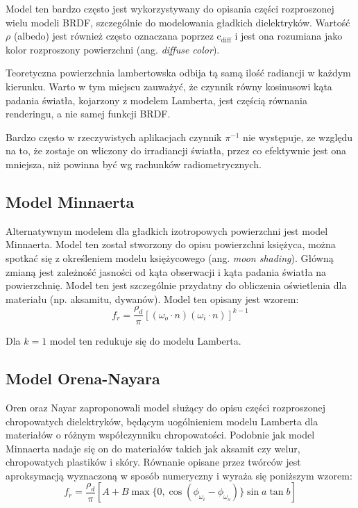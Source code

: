 \documentclass[../main.tex]{subfiles}
\begin{document}
Model ten bardzo często jest wykorzystywany do opisania części rozproszonej wielu modeli BRDF, szczególnie do modelowania gładkich dielektryków. Wartość $\rho$ (albedo) jest również często oznaczana poprzez $\text{c}_{\text{diff}}$ i jest ona rozumiana jako kolor rozproszony powierzchni (ang. \textit{diffuse color}).

Teoretyczna powierzchnia lambertowska odbija tą samą ilość radiancji w każdym kierunku. Warto w tym miejscu zauważyć, że czynnik równy kosinusowi kąta padania światła, kojarzony z modelem Lamberta, jest częścią równania renderingu, a nie samej funkcji BRDF.

Bardzo często w rzeczywistych aplikacjach czynnik $\pi^{-1}$ nie występuje, ze względu na to, że zostaje on wliczony do irradiancji światła, przez co efektywnie jest ona mniejsza, niż powinna być wg rachunków radiometrycznych. 

\subsection{Model Minnaerta}

Alternatywnym modelem dla gładkich izotropowych powierzchni jest model
Minnaerta. Model ten został stworzony do opisu powierzchni księżyca, można
spotkać się z określeniem modelu księżycowego (ang. \textit{moon shading}).
Główną zmianą jest zależność jasności od kąta obserwacji i kąta padania światła
na powierzchnię.  Model ten jest szczególnie przydatny do obliczenia
oświetlenia dla materiału (np. aksamitu, dywanów). Model ten opisany jest wzorem:
\[
  f_r = \frac{\rho_d}{\pi} \left[
    (\omega_o \cdot n) (\omega_i \cdot n)
  \right]^{k-1}
\]

\noindent Dla $k=1$ model ten redukuje się do modelu Lamberta.

\subsection{Model Orena-Nayara}

Oren oraz Nayar zaproponowali model służący do opisu części rozproszonej chropowatych
dielektryków, będącym uogólnieniem modelu Lamberta dla materiałów o różnym
współczynniku chropowatości. Podobnie jak model Minnaerta nadaje się on do
materiałów takich jak aksamit czy welur, chropowatych plastików i
skóry. Równanie opisane przez twórców jest aproksymacją wyznaczoną w sposób numeryczny i wyraża się poniższym
wzorem:
\[
  f_r = \frac{\rho_d}{\pi} \left[
    A +
    B
      \max\{ 0, \cos\left(\phi_{\omega_i} - \phi_{\omega_o}\right) \}
      \sin a \tan b
  \right]
\]
\end{document}
